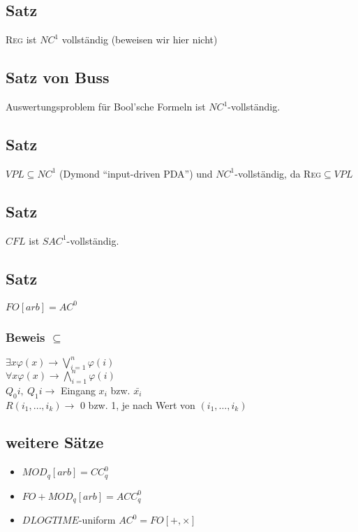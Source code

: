     \subsection{Satz}
        \textsc{Reg} ist $NC^1$ vollständig (beweisen wir hier nicht)
    \subsection{Satz von Buss}
        Auswertungsproblem für Bool'sche Formeln ist $NC^1$-vollständig.
    \subsection{Satz}
        $VPL\subseteq NC^1$ (Dymond ``input-driven PDA'') und $NC^1$-vollständig, da \textsc{Reg}$\subseteq VPL$
    \subsection{Satz}
        $CFL$ ist $SAC^1$-vollständig.
    \subsection{Satz}
        $FO[arb]=AC^0$
        \subsubsection{Beweis $\subseteq$}
            $\exists x\varphi(x)\rightarrow \bigvee\limits_{i=1}^n \varphi(i)$\\
            $\forall x\varphi(x)\rightarrow \bigwedge\limits_{i=1}^n \varphi(i)$\\
            $Q_0i,\ Q_1i\rightarrow$ Eingang $x_i$ bzw. $\bar{x_i}$\\
            $R(i_1,\dots,i_k)\rightarrow$ 0 bzw. 1, je nach Wert von $(i_1,\dots,i_k)$
    \subsection{weitere Sätze}
        \begin{itemize}
            \item $MOD_q[arb]=CC^0_q$
            \item $FO+MOD_q[arb]=ACC_q^0$
            \item $DLOGTIME$-uniform $AC^0=FO[+,\times]$
        \end{itemize}

